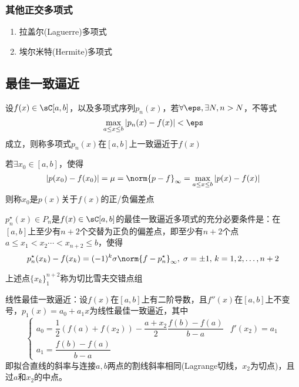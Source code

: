 \subsubsection{其他正交多项式}
\begin{enumerate}
    \item 拉盖尔(Laguerre)多项式
    \item 埃尔米特(Hermite)多项式
\end{enumerate}

\subsection{最佳一致逼近}
\begin{definition}
    设$f(x)\in\sC[a,b]$，以及多项式序列$p_n(x)$，若$\forall\eps,\exists N, n> N$，不等式
    \[\max_{a\leq x\leq b}|p_n(x)-f(x)|<\eps\]
    成立，则称多项式$p_n(x)$在$[a,b]$上一致逼近于$f(x)$
\end{definition}
\begin{definition}
    若$\exists x_0\in[a,b]$，使得
    \[|p(x_0)-f(x_0)|=\mu=\norm{p-f}_\infty=\max_{a\leq x\leq b}|p(x)-f(x)|\]
    则称$x_0$是$p(x)$关于$f(x)$的正/负偏差点
\end{definition}
\begin{theorem}[Chebyshev]
    $p_n^\star(x)\in P_n$是$f(x)\in\sC[a,b]$的最佳一致逼近多项式的充分必要条件是：在$[a,b]$上至少有$n+2$个交替为正负的偏差点，即至少有$n+2$个点$a\leq x_1<x_2\cdots<x_{n+2}\leq b$，使得
    \[p_n^\star(x_k)-f(x_k)=(-1)^k\sigma\norm{f-p_n^\star}_\infty,\;\sigma=\pm 1,\,k=1,2,\ldots,n+2\]
\end{theorem}
上述点$\{x_k\}_1^{n+2}$称为切比雪夫交错点组

线性最佳一致逼近：设$f(x)$在$[a,b]$上有二阶导数，且$f''(x)$在$[a,b]$上不变号，$p_1(x)=a_0+a_1x$为线性最佳一致逼近，其中
\[\begin{cases}
    a_0=\dfrac{1}{2}(f(a)+f(x_2))-\dfrac{a+x_2}{2}\dfrac{f(b)-f(a)}{b-a} & f'(x_2)=a_1\\
    a_1=\dfrac{f(b)-f(a)}{b-a}
\end{cases}\]
即拟合直线的斜率与连接$a,b$两点的割线斜率相同(Lagrange切线，$x_2$为切点)，且过$a$和$x_2$的中点。

